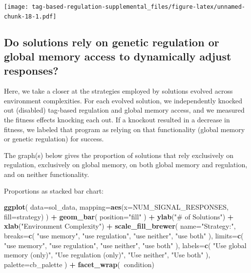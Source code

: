 \documentclass[]{book}
\newenvironment{Shaded}{\begin{snugshade}}{\end{snugshade}}
\newcommand{\DataTypeTok}[1]{\textcolor[rgb]{0.13,0.29,0.53}{#1}}
\newcommand{\KeywordTok}[1]{\textcolor[rgb]{0.13,0.29,0.53}{\textbf{#1}}}
\newcommand{\NormalTok}[1]{#1}
\newcommand{\OperatorTok}[1]{\textcolor[rgb]{0.81,0.36,0.00}{\textbf{#1}}}
\newcommand{\StringTok}[1]{\textcolor[rgb]{0.31,0.60,0.02}{#1}}
\begin{document}
\texttt{[image: tag-based-regulation-supplemental\_files/figure-latex/unnamed-chunk-18-1.pdf]}

\hypertarget{do-solutions-rely-on-genetic-regulation-or-global-memory-access-to-dynamically-adjust-responses}{%
\subsection{Do solutions rely on genetic regulation or global memory access to dynamically adjust responses?}\label{do-solutions-rely-on-genetic-regulation-or-global-memory-access-to-dynamically-adjust-responses}}

Here, we take a closer at the strategies employed by solutions evolved across environment complexities.
For each evolved solution, we independently knocked out (disabled) tag-based regulation and global memory access, and we measured the fitness effects knocking each out.
If a knockout resulted in a decrease in fitness, we labeled that program as relying on that functionality (global memory or genetic regulation) for success.

The graph(s) below gives the proportion of solutions that rely exclusively on regulation, exclusively on global memory, on both global memory and regulation, and on neither functionality.

Proportions as stacked bar chart:

\begin{Shaded}
\begin{Highlighting}[]
\KeywordTok{ggplot}\NormalTok{( }\DataTypeTok{data=}\NormalTok{sol_data, }\DataTypeTok{mapping=}\KeywordTok{aes}\NormalTok{(}\DataTypeTok{x=}\NormalTok{NUM_SIGNAL_RESPONSES, }\DataTypeTok{fill=}\NormalTok{strategy) ) }\OperatorTok{+}
\StringTok{  }\KeywordTok{geom_bar}\NormalTok{(}
    \DataTypeTok{position=}\StringTok{"fill"}
\NormalTok{  ) }\OperatorTok{+}
\StringTok{  }\KeywordTok{ylab}\NormalTok{(}\StringTok{"# of Solutions"}\NormalTok{) }\OperatorTok{+}
\StringTok{  }\KeywordTok{xlab}\NormalTok{(}\StringTok{"Environment Complexity"}\NormalTok{) }\OperatorTok{+}
\StringTok{  }\KeywordTok{scale_fill_brewer}\NormalTok{(}
    \DataTypeTok{name=}\StringTok{"Strategy:"}\NormalTok{,}
    \DataTypeTok{breaks=}\KeywordTok{c}\NormalTok{(}
      \StringTok{"use memory"}\NormalTok{,}
      \StringTok{"use regulation"}\NormalTok{,}
      \StringTok{"use neither"}\NormalTok{,}
      \StringTok{"use both"}
\NormalTok{    ),}
    \DataTypeTok{limits=}\KeywordTok{c}\NormalTok{(}
      \StringTok{"use memory"}\NormalTok{,}
      \StringTok{"use regulation"}\NormalTok{,}
      \StringTok{"use neither"}\NormalTok{,}
      \StringTok{"use both"}
\NormalTok{    ),}
    \DataTypeTok{labels=}\KeywordTok{c}\NormalTok{(}
      \StringTok{"Use global memory (only)"}\NormalTok{,}
      \StringTok{"Use regulation (only)"}\NormalTok{,}
      \StringTok{"Use neither"}\NormalTok{,}
      \StringTok{"Use both"}
\NormalTok{    ),}
    \DataTypeTok{palette=}\NormalTok{cb_palette}
\NormalTok{  ) }\OperatorTok{+}
\StringTok{  }\KeywordTok{facet_wrap}\NormalTok{(}\OperatorTok{~}\NormalTok{condition)}
\end{Highlighting}
\end{Shaded}
\end{document}
